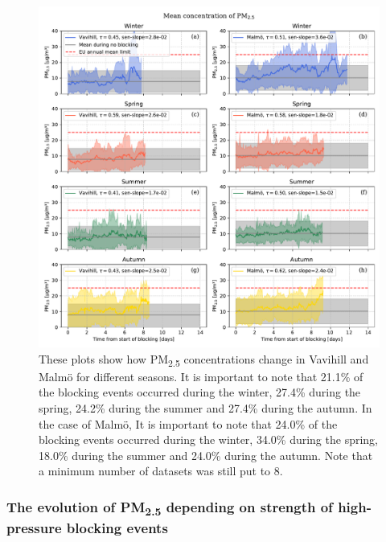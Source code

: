 \begin{figure}[H]
    \centering
    \includegraphics[width=\textwidth]{Figures/Meanplot_seasonal.pdf}
    \caption{These plots show how PM\textsubscript{2.5} concentrations change in Vavihill and Malmö for different seasons. It is important to note that 21.1\% of the blocking events occurred during the winter, 27.4\% during the spring, 24.2\% during the summer and 27.4\% during the autumn. In the case of Malmö, It is important to note that 24.0\% of the blocking events occurred during the winter, 34.0\% during the spring, 18.0\% during the summer and 24.0\% during the autumn. Note that a minimum number of datasets was still put to 8.}
    \label{fig:Meanplot_seasonal}
\end{figure}

\subsubsection{The evolution of \texorpdfstring{PM\textsubscript{2.5}}{PM2.5} depending on strength of high-pressure blocking events}



